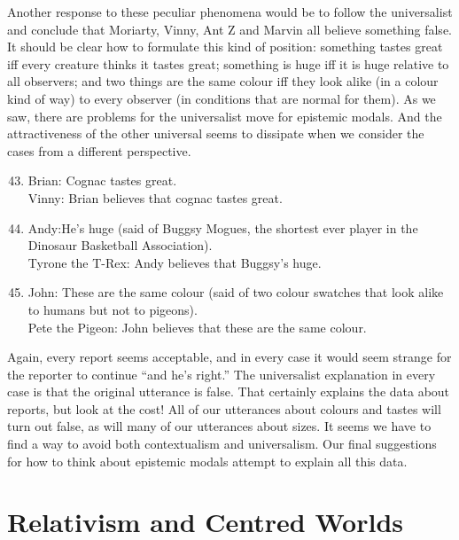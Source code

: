 Another response to these peculiar phenomena would be to follow the universalist and conclude that Moriarty, Vinny, Ant Z and Marvin all believe something false. It should be clear how to formulate this kind of position: something tastes great iff every creature thinks it tastes great; something is huge iff it is huge relative to all observers; and two things are the same colour iff they look alike (in a colour kind of way) to every observer (in conditions that are normal for them). As we saw, there are problems for the universalist move for epistemic modals. And the attractiveness of the other universal seems to dissipate when we consider the cases from a different perspective. 
 
\begin{enumerate}
\setcounter{enumi}{42} 
\item Brian: Cognac tastes great. \\
Vinny: Brian believes that cognac tastes great.\\
\item Andy:He's huge (said of Buggsy Mogues, the shortest ever player in the Dinosaur Basketball Association). \\
Tyrone the T-Rex: Andy believes that Buggsy's huge. \\
\item John: These are the same colour (said of two colour swatches that look alike to humans but not to pigeons). \\
Pete the Pigeon: John believes that these are the same colour.
\end{enumerate}

\noindent Again, every report seems acceptable, and in every case it would seem strange for the reporter to continue ``and he's right.'' The universalist explanation in every case is that the original utterance is false. That certainly explains the data about reports, but look at the cost! All of our utterances about colours and tastes will turn out false, as will many of our utterances about sizes. It seems we have to find a way to avoid both contextualism and universalism. Our final suggestions for how to think about epistemic modals attempt to explain all this data.
 
 
\section{Relativism and Centred Worlds}  
 
